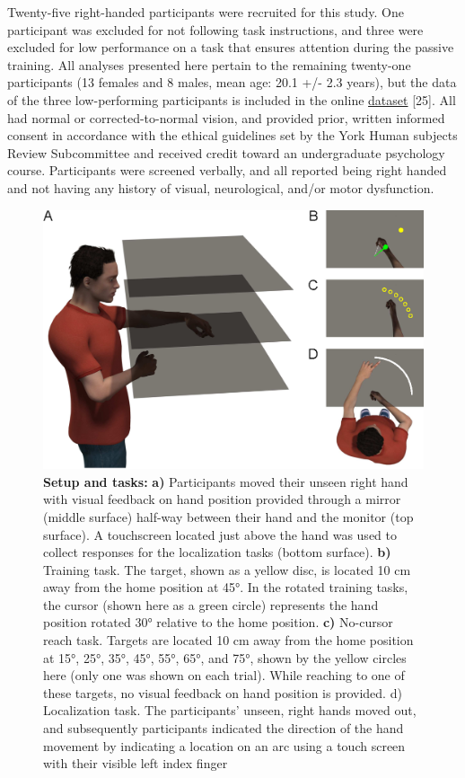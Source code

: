 \documentclass[10pt,letterpaper]{article}
\begin{document}
Twenty-five right-handed participants were recruited for this study. One
participant was excluded for not following task instructions, and three
were excluded for low performance on a task that ensures attention
during the passive training. All analyses presented here pertain to the
remaining twenty-one participants (13 females and 8 males, mean age:
20.1 +/- 2.3 years), but the data of the three low-performing
participants is included in the online
\href{https://osf.io/zfdth}{dataset} {[}25{]}. All had normal or
corrected-to-normal vision, and provided prior, written informed consent
in accordance with the ethical guidelines set by the York Human subjects
Review Subcommittee and received credit toward an undergraduate
psychology course. Participants were screened verbally, and all reported
being right handed and not having any history of visual, neurological,
and/or motor dysfunction.

\begin{figure}
\centering
\includegraphics{Fig1_setup.eps}
\caption{\textbf{Setup and tasks:} \textbf{a)} Participants moved their
unseen right hand with visual feedback on hand position provided through
a mirror (middle surface) half-way between their hand and the monitor
(top surface). A touchscreen located just above the hand was used to
collect responses for the localization tasks (bottom surface).
\textbf{b)} Training task. The target, shown as a yellow disc, is
located 10 cm away from the home position at 45°. In the rotated
training tasks, the cursor (shown here as a green circle) represents the
hand position rotated 30° relative to the home position. \textbf{c)}
No-cursor reach task. Targets are located 10 cm away from the home
position at 15°, 25°, 35°, 45°, 55°, 65°, and 75°, shown by the yellow
circles here (only one was shown on each trial). While reaching to one
of these targets, no visual feedback on hand position is provided. d)
Localization task. The participants' unseen, right hands moved out, and
subsequently participants indicated the direction of the hand movement
by indicating a location on an arc using a touch screen with their
visible left index finger}
\end{figure}
\end{document}
